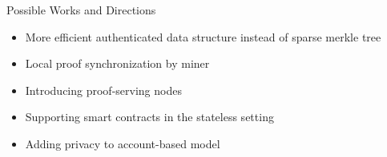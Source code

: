\documentclass[biblatex,aspectratio=169,11pt]{mybeamer}
\begin{document}
\begin{frame}{Possible Works and Directions}
  \begin{itemize}[<+->]
    \item More efficient authenticated data structure instead of sparse merkle tree
    \item Local proof synchronization by miner
    \item Introducing proof-serving nodes
    \item Supporting smart contracts in the stateless setting
    \item Adding privacy to account-based model
  \end{itemize}
\end{frame}

\nocite{*}
\PrintRef%
\PrintQA%
\end{document}
